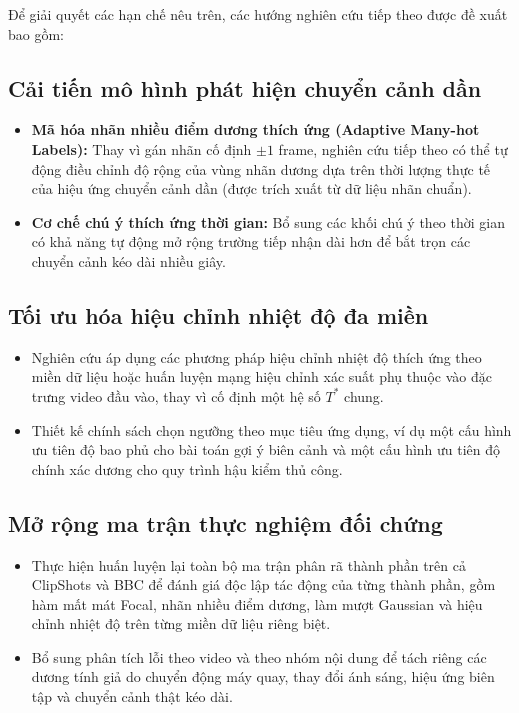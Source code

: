 Để giải quyết các hạn chế nêu trên, các hướng nghiên cứu tiếp theo được đề xuất bao gồm:

\subsection{Cải tiến mô hình phát hiện chuyển cảnh dần}
\begin{itemize}
    \item \textbf{Mã hóa nhãn nhiều điểm dương thích ứng (Adaptive Many-hot Labels):} Thay vì gán nhãn cố định $\pm 1$ frame, nghiên cứu tiếp theo có thể tự động điều chỉnh độ rộng của vùng nhãn dương dựa trên thời lượng thực tế của hiệu ứng chuyển cảnh dần (được trích xuất từ dữ liệu nhãn chuẩn).
    \item \textbf{Cơ chế chú ý thích ứng thời gian:} Bổ sung các khối chú ý theo thời gian có khả năng tự động mở rộng trường tiếp nhận dài hơn để bắt trọn các chuyển cảnh kéo dài nhiều giây.
\end{itemize}

\subsection{Tối ưu hóa hiệu chỉnh nhiệt độ đa miền}
\begin{itemize}
    \item Nghiên cứu áp dụng các phương pháp hiệu chỉnh nhiệt độ thích ứng theo miền dữ liệu hoặc huấn luyện mạng hiệu chỉnh xác suất phụ thuộc vào đặc trưng video đầu vào, thay vì cố định một hệ số $T^*$ chung.
    \item Thiết kế chính sách chọn ngưỡng theo mục tiêu ứng dụng, ví dụ một cấu hình ưu tiên độ bao phủ cho bài toán gợi ý biên cảnh và một cấu hình ưu tiên độ chính xác dương cho quy trình hậu kiểm thủ công.
\end{itemize}

\subsection{Mở rộng ma trận thực nghiệm đối chứng}
\begin{itemize}
    \item Thực hiện huấn luyện lại toàn bộ ma trận phân rã thành phần trên cả ClipShots và BBC để đánh giá độc lập tác động của từng thành phần, gồm hàm mất mát Focal, nhãn nhiều điểm dương, làm mượt Gaussian và hiệu chỉnh nhiệt độ trên từng miền dữ liệu riêng biệt.
    \item Bổ sung phân tích lỗi theo video và theo nhóm nội dung để tách riêng các dương tính giả do chuyển động máy quay, thay đổi ánh sáng, hiệu ứng biên tập và chuyển cảnh thật kéo dài.
\end{itemize}
